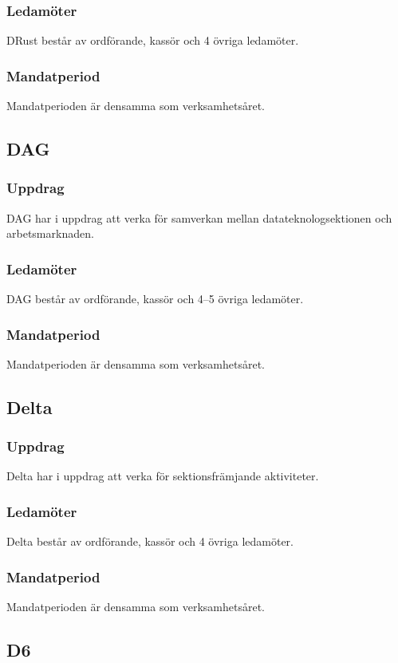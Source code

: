 \subsubsection{Ledamöter}
DRust består av ordförande, kassör och 4 övriga ledamöter.
\subsubsection{Mandatperiod}
Mandatperioden är densamma som verksamhetsåret. 

\subsection{DAG}
\subsubsection{Uppdrag} 
DAG har i uppdrag att verka för samverkan mellan datateknologsektionen och arbetsmarknaden. 
\subsubsection{Ledamöter}
DAG består av ordförande, kassör och 4--5 övriga ledamöter.
\subsubsection{Mandatperiod}
Mandatperioden är densamma som verksamhetsåret.

\subsection{Delta}
\subsubsection{Uppdrag}
Delta har i uppdrag att verka för sektionsfrämjande aktiviteter. 
\subsubsection{Ledamöter}
Delta består av ordförande, kassör och 4 övriga ledamöter.
\subsubsection{Mandatperiod}
Mandatperioden är densamma som verksamhetsåret. 

\subsection{D6}

